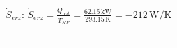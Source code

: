 \( \dot{S}_{erz} \):  
\( \dot{S}_{erz} = \frac{\dot{Q}_{out}}{\overline{T}_{KF}} = \frac{62.15 \, \text{kW}}{293.15 \, \text{K}} = -212 \, \text{W/K}\)  

---